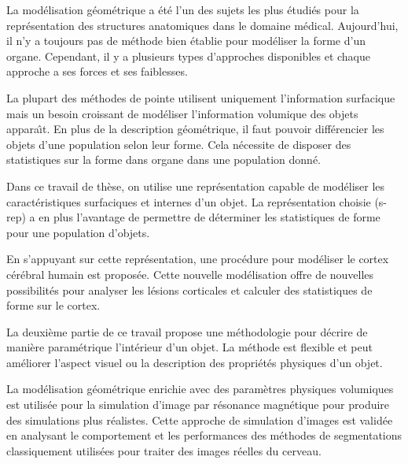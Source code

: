 \begin{changemargin}{-2cm}{-1cm}
La mod\'elisation g\'eom\'etrique a \'et\'e l'un des sujets les plus \'etudi\'es pour la repr\'esentation des structures anatomiques dans le domaine m\'edical.
Aujourd'hui, il n'y a toujours pas de m\'ethode bien \'etablie pour mod\'eliser la forme d'un organe.
Cependant, il y a plusieurs types d'approches disponibles et chaque approche a ses forces et ses faiblesses.

La plupart des m\'ethodes de pointe utilisent uniquement l'information surfacique mais
un besoin croissant de mod\'eliser l'information volumique des objets appara\^{\i}t.
En plus de la description g\'eom\'etrique, il faut pouvoir diff\'erencier les objets d'une population selon leur forme.
Cela n\'ecessite de disposer des statistiques sur la forme dans organe dans une population donn\'e.

Dans ce travail de th\`ese, on utilise une repr\'esentation capable de mod\'eliser les caract\'eristiques surfaciques et internes d'un objet.
La repr\'esentation choisie (s-rep) a en plus l'avantage de permettre de d\'eterminer les statistiques de forme pour une population d'objets.

En s'appuyant sur cette repr\'esentation, une proc\'edure pour mod\'eliser le cortex c\'er\'ebral humain est propos\'ee.
Cette nouvelle mod\'elisation offre de nouvelles possibilit\'es pour analyser les l\'esions corticales
et calculer des statistiques de forme sur le cortex.

La deuxi\`eme partie de ce travail propose une m\'ethodologie pour d\'ecrire de mani\`ere param\'etrique l'int\'erieur d'un objet.
La m\'ethode est flexible et peut am\'eliorer l'aspect visuel ou la description des propri\'et\'es physiques d'un objet.

La mod\'elisation g\'eom\'etrique enrichie avec des param\`etres physiques volumiques
est utilis\'ee pour la simulation d'image par r\'esonance magn\'etique pour produire des simulations plus r\'ealistes.
Cette approche de simulation d'images est valid\'ee en analysant le comportement et les performances des m\'ethodes de segmentations
classiquement utilis\'ees pour traiter des images r\'eelles du cerveau.


\end{changemargin}
